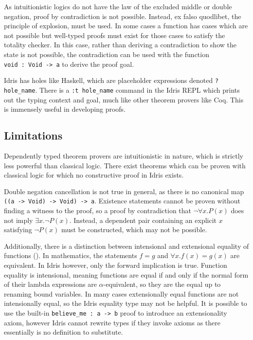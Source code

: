 \documentclass[11pt]{report}
\begin{document}
\begin{spacing}{1.15}
As intuitionistic logics do not have the law of the excluded middle or double negation, proof by contradiction is not possible. Instead, ex falso quodlibet, the principle of explosion, must be used. In some cases a function has cases which are not possible but well-typed proofs must exist for those cases to satisfy the totality checker. In this case, rather than deriving a contradiction to show the state is not possible, the contradiction can be used with the function \texttt{void\ :\ Void\ ->\ a} to derive the proof goal.

Idris has holes like Haskell, which are placeholder expressions denoted \texttt{?hole\_name}. There is a \texttt{:t hole\_name} command in the Idris REPL which prints out the typing context and goal, much like other theorem provers like Coq. This is immensely useful in developing proofs.

\subsection{Limitations}

Dependently typed theorem provers are intuitionistic in nature, which is strictly less powerful than classical logic. There exist theorems which can be proven with classical logic for which no constructive proof in Idris exists.

Double negation cancellation is not true in general, as there is no canonical map \texttt{((a\ ->\ Void)\ ->\ Void)\ ->\ a}. Existence statements cannot be proven without finding a witness to the proof, so a proof by contradiction that $\neg\forall x.P(x)$ does not imply $\exists x.\neg P(x)$. Instead, a dependent pair containing an explicit $x$ satisfying $\neg P(x)$ must be constructed, which may not be possible.

Additionally, there is a distinction between intensional and extensional equality of functions (\cite{nlab:funext}). In mathematics, the statements $f=g$ and $\forall x. f(x)=g(x)$ are equivalent. In Idris however, only the forward implication is true. Function equality is intensional, meaning functions are equal if and only if the normal form of their lambda expressions are $\alpha$-equivalent, so they are the equal up to renaming bound variables. In many cases extensionally equal functions are not intensionally equal, so the Idris equality type may not be helpful. It is possible to use the built-in \texttt{believe\_me\ :\ a\ ->\ b} proof to introduce an extensionality axiom, however Idris cannot rewrite types if they invoke axioms as there essentially is no definition to substitute.


\end{spacing}
\end{document}
